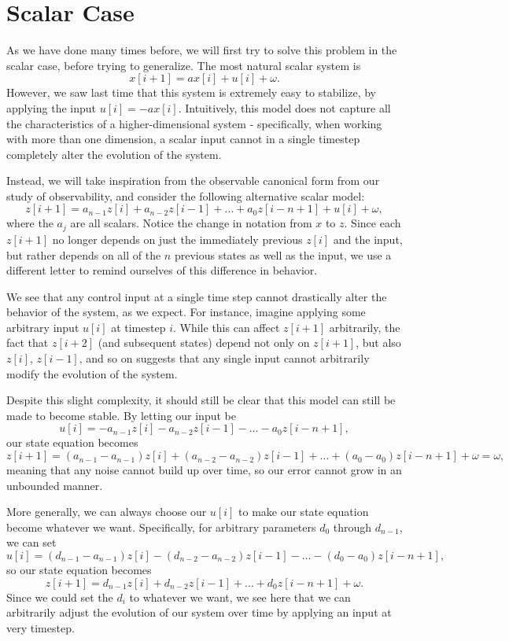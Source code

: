 \documentclass[letterpaper]{article}
\theoremstyle{remark}
\begin{document}
\section{Scalar Case}
As we have done many times before, we will first try to solve this problem in the scalar case, before trying to generalize. The most natural scalar system is
\[
    x[i + 1] = ax[i] + u[i] + \omega.
\]
However, we saw last time that this system is extremely easy to stabilize, by applying the input $u[i] = -ax[i]$. Intuitively, this model does not capture all the characteristics of a higher-dimensional system - specifically, when working with more than one dimension, a scalar input cannot in a single timestep completely alter the evolution of the system.

Instead, we will take inspiration from the observable canonical form from our study of observability, and consider the following alternative scalar model:
\[
    z[i + 1] = a_{n - 1}z[i] + a_{n - 2}z[i-1] + \ldots + a_0z[i - n + 1] + u[i] + \omega,
\]
where the $a_j$ are all scalars. Notice the change in notation from $x$ to $z$. Since each $z[i + 1]$ no longer depends on just the immediately previous $z[i]$ and the input, but rather depends on all of the $n$ previous states as well as the input, we use a different letter to remind ourselves of this difference in behavior.

We see that any control input at a single time step cannot drastically alter the behavior of the system, as we expect. For instance, imagine applying some arbitrary input $u[i]$ at timestep $i$. While this can affect $z[i + 1]$ arbitrarily, the fact that $z[i + 2]$ (and subsequent states) depend not only on $z[i + 1]$, but also $z[i]$, $z[i - 1]$, and so on suggests that any single input cannot arbitrarily modify the evolution of the system.

Despite this slight complexity, it should still be clear that this model can still be made to become stable. By letting our input be
\[
    u[i] = -a_{n-1}z[i] - a_{n-2}z[i - 1] - \ldots - a_0z[i - n + 1],
\]
our state equation becomes
\[
    z[i + 1] = (a_{n-1}-a_{n-1})z[i] + (a_{n-2}-a_{n-2})z[i-1] + \ldots + (a_0-a_0)z[i - n + 1] + \omega = \omega,
\]
meaning that any noise cannot build up over time, so our error cannot grow in an unbounded manner.

More generally, we can always choose our $u[i]$ to make our state equation become whatever we want. Specifically, for arbitrary parameters $d_0$ through $d_{n-1}$, we can set
\[
    u[i] = (d_{n-1} - a_{n-1})z[i] - (d_{n-2} - a_{n-2})z[i - 1] - \ldots - (d_0 - a_0)z[i - n + 1],
\]
so our state equation becomes
\[
    z[i+1] = d_{n-1}z[i] + d_{n-2}z[i-1] + \ldots + d_0z[i - n + 1] + \omega.
\]
Since we could set the $d_i$ to whatever we want, we see here that we can arbitrarily adjust the evolution of our system over time by applying an input at very timestep.
\end{document}
